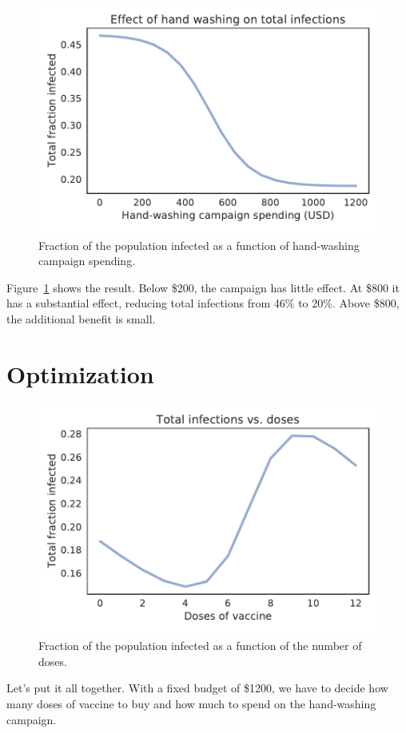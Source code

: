 \documentclass[12pt]{book}
\theoremstyle{exercise}
\begin{document}
\begin{figure}
\centerline{\includegraphics[height=3in]{figs/chap05-fig05.pdf}}
\caption{Fraction of the population infected as a function of hand-washing campaign spending.}
\label{chap05-fig05}
\end{figure} 

Figure~\ref{chap05-fig05} shows the result.  Below \$200, the campaign has little effect.  At \$800 it has a substantial effect, reducing total infections from 46\% to 20\%.  Above \$800, the additional benefit is small.


\section{Optimization} 

\begin{figure}
\centerline{\includegraphics[height=3in]{figs/chap05-fig06.pdf}}
\caption{Fraction of the population infected as a function of the number of doses.}
\label{chap05-fig06}
\end{figure} 

Let's put it all together.  With a fixed budget of \$1200, we have to decide how many doses of vaccine to buy and how much to spend on the hand-washing campaign.
\end{document}

